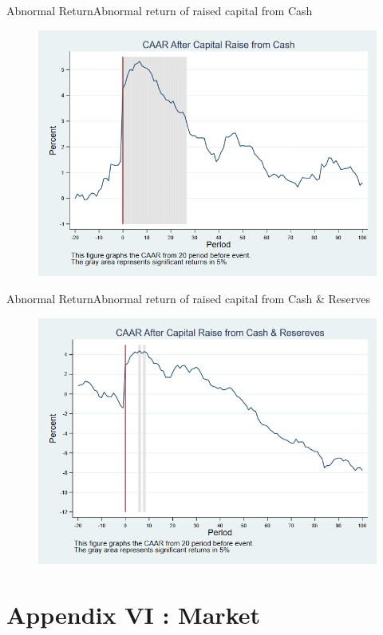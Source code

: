 \documentclass{beamer}
\begin{document}
\begin{frame}{Abnormal Return}{Abnormal return of raised capital from Cash}
\label{abreturncash4Factor}
\begin{figure}
\centering
\includegraphics[width=0.65\linewidth]{AbReturnCash_4Factor}
\label{fig:abreturncash2}
\end{figure}
\hfill\hyperlink{abreturncash}{}
\end{frame}


\begin{frame}{Abnormal Return}{Abnormal return of raised capital from Cash \& Reserves}
\label{abreturnhybrid4Factor}
\begin{figure}
\centering
\includegraphics[width=0.65\linewidth]{AbReturnHybrid_4Factor}
\label{fig:abreturnhybrid2}
\end{figure}
\hfill\hyperlink{abreturnhybrid}{}
\end{frame}


\section{Appendix VI : Market}
\end{document}
